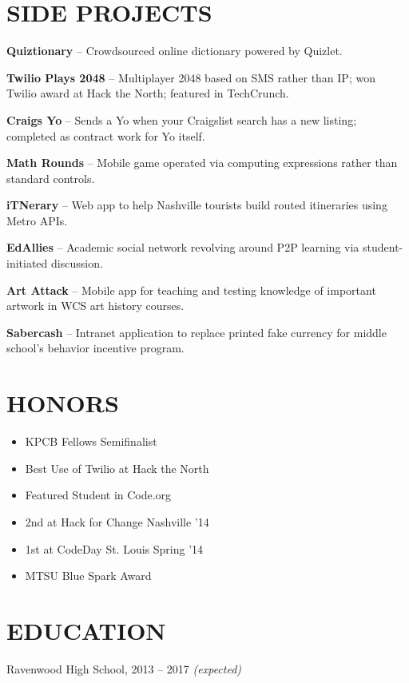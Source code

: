 \documentclass{res}
\begin{document}
\section{SIDE PROJECTS}

\textbf{Quiztionary} -- Crowdsourced online dictionary powered by Quizlet.

\textbf{Twilio Plays 2048} -- Multiplayer 2048 based on SMS rather than IP; won Twilio award at Hack the North; featured in TechCrunch.

\textbf{Craigs Yo} -- Sends a Yo when your Craigslist search has a new listing; completed as contract work for Yo itself.

\textbf{Math Rounds} -- Mobile game operated via computing expressions rather than standard controls.

\textbf{iTNerary} -- Web app to help Nashville tourists build routed itineraries using Metro APIs.

\textbf{EdAllies} -- Academic social network revolving around P2P learning via student-initiated discussion.

\textbf{Art Attack} -- Mobile app for teaching and testing knowledge of important artwork in WCS art history courses.

\textbf{Sabercash} -- Intranet application to replace printed fake currency for middle school's behavior incentive program.

\section{HONORS}

\begin{itemize} \itemsep -2pt
  \item KPCB Fellows Semifinalist
  \item Best Use of Twilio at Hack the North
  \item Featured Student in Code.org
  \item 2nd at Hack for Change Nashville '14
  \item 1st at CodeDay St. Louis Spring '14
  \item MTSU Blue Spark Award
\end{itemize}

\section{EDUCATION}

Ravenwood High School, 2013 -- 2017 \textit {(expected)}
\end{document}
